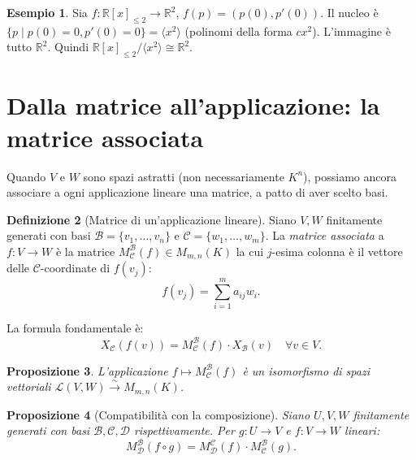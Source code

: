 \documentclass[11pt, a4paper]{book}
\theoremstyle{definition}
\newtheorem{definizione}{Definizione}[section]
\newtheorem{esempio}[definizione]{Esempio}
\theoremstyle{plain}
\newtheorem{proposizione}[definizione]{Proposizione}
\theoremstyle{remark}
\newcommand{\R}{\mathbb{R}}
\begin{document}
\begin{exbox}
\begin{esempio}
Sia $f \colon \R[x]_{\leq 2} \to \R^2$, $f(p) = (p(0), p'(0))$. Il nucleo è $\{p \mid p(0) = 0, p'(0) = 0\} = \langle x^2 \rangle$ (polinomi della forma $cx^2$). L'immagine è tutto $\R^2$. Quindi $\R[x]_{\leq 2} / \langle x^2 \rangle \cong \R^2$.
\end{esempio}
\end{exbox}

\section{Dalla matrice all'applicazione: la matrice associata}
\label{sec:matrice-associata}

Quando $V$ e $W$ sono spazi astratti (non necessariamente $K^n$), possiamo ancora associare a ogni applicazione lineare una matrice, a patto di aver scelto basi.

\begin{defbox}
\begin{definizione}[Matrice di un'applicazione lineare]
Siano $V, W$ finitamente generati con basi $\mathcal{B} = \{v_1, \ldots, v_n\}$ e $\mathcal{C} = \{w_1, \ldots, w_m\}$. La \emph{matrice associata} a $f \colon V \to W$ è la matrice $M^\mathcal{B}_\mathcal{C}(f) \in M_{m,n}(K)$ la cui $j$-esima colonna è il vettore delle $\mathcal{C}$-coordinate di $f(v_j)$:
\[
  f(v_j) = \sum_{i=1}^m a_{ij} w_i.
\]
\end{definizione}
\end{defbox}

La formula fondamentale è:
\[
  X_\mathcal{C}(f(v)) = M^\mathcal{B}_\mathcal{C}(f) \cdot X_\mathcal{B}(v) \quad \forall v \in V.
\]

\begin{proposizione}
L'applicazione $f \mapsto M^\mathcal{B}_\mathcal{C}(f)$ è un isomorfismo di spazi vettoriali $\mathcal{L}(V,W) \xrightarrow{\sim} M_{m,n}(K)$.
\end{proposizione}

\begin{proposizione}[Compatibilità con la composizione]
Siano $U, V, W$ finitamente generati con basi $\mathcal{B}, \mathcal{C}, \mathcal{D}$ rispettivamente. Per $g \colon U \to V$ e $f \colon V \to W$ lineari:
\[
  M^\mathcal{B}_\mathcal{D}(f \circ g) = M^\mathcal{C}_\mathcal{D}(f) \cdot M^\mathcal{B}_\mathcal{C}(g).
\]
\end{proposizione}
\end{document}
